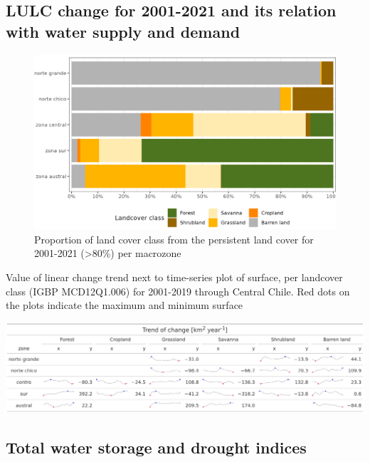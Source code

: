 \documentclass[
  number,
  preprint,
  3p]{elsarticle}
\begin{document}
\hypertarget{lulc-change-for-2001-2021-and-its-relation-with-water-supply-and-demand}{%
\subsection{LULC change for 2001-2021 and its relation with water supply
and
demand}\label{lulc-change-for-2001-2021-and-its-relation-with-water-supply-and-demand}}

\begin{figure}[!ht]

{\centering \includegraphics{../output/figs/LC_pers80_per_macrozone.png}

}

\caption{Proportion of land cover class from the persistent land cover
for 2001-2021 (\textgreater80\%) per macrozone}

\end{figure}

\begin{table}[!ht]
\caption{Value of linear change trend next to time-series plot of surface, per landcover class (IGBP MCD12Q1.006) for 2001-2019 through Central Chile. Red dots on the plots indicate the maximum and minimum surface}
\includegraphics[]{../output/figs/table_var_landcover_macro.png}
\end{table}

\hypertarget{total-water-storage-and-drought-indices}{%
\subsection{Total water storage and drought
indices}\label{total-water-storage-and-drought-indices}}
\end{document}
